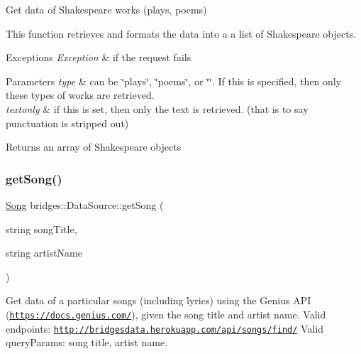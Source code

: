 Get data of Shakespeare works (plays, poems) 

This function retrieves and formats the data into a a list of Shakespeare objects.


\begin{DoxyExceptions}{Exceptions}
{\em Exception} & if the request fails\\
\hline
\end{DoxyExceptions}

\begin{DoxyParams}{Parameters}
{\em type} & can be \char`\"{}plays\char`\"{}, \char`\"{}poems\char`\"{}, or \char`\"{}\char`\"{}. If this is specified, then only these types of works are retrieved. \\
\hline
{\em textonly} & if this is set, then only the text is retrieved. (that is to say punctuation is stripped out)\\
\hline
\end{DoxyParams}
\begin{DoxyReturn}{Returns}
an array of Shakespeare objects 
\end{DoxyReturn}
\mbox{\label{classbridges_1_1_data_source_a284c9d572415b67df6989ab8ab97d0e2}} 
\subsubsection{\texorpdfstring{get\+Song()}{getSong()}}
{\footnotesize\ttfamily \hyperlink{classbridges_1_1dataset_1_1_song}{Song} bridges\+::\+Data\+Source\+::get\+Song (\begin{DoxyParamCaption}\item[{string}]{song\+Title,  }\item[{string}]{artist\+Name }\end{DoxyParamCaption})\hspace{0.3cm}{\ttfamily [inline]}}



Get data of a particular songs (including lyrics) using the Genius A\+PI (\href{https://docs.genius.com/}{\tt https\+://docs.\+genius.\+com/}), given the song title and artist name. Valid endpoints\+: \href{http://bridgesdata.herokuapp.com/api/songs/find/}{\tt http\+://bridgesdata.\+herokuapp.\+com/api/songs/find/} Valid query\+Params\+: song title, artist name. 

